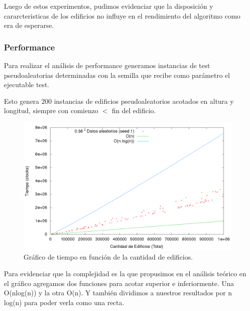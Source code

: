 Luego de estos experimentos, pudimos evidenciar que la disposición y cararcteristicas de los edificios no influye en el rendimiento del algoritmo como era de esperarse.


\subsubsection*{Performance}

Para realizar el análisis de performance generamos instancias de test pseudoaleatorias determinadas con la semilla que recibe como parámetro el ejecutable test.

Esto genera 200 instancias de edificios pseudoaleatorios acotados en altura y longitud, siempre con comienzo $<$ fin del edificio.

\begin{figure}[H]
\begin{center}
\includegraphics[scale=0.35]{./imagenes/ej2_chartRendimiento.png}
\caption{Gr\'afico de tiempo en funci\'on de la cantidad de edificios.}
\end{center}
\end{figure}

Para evidenciar que la complejidad es la que propusimos en el análisis teórico en el gráfico agregamos dos funciones para acotar superior e inferiormente. Una O(nlog(n)) y la otra O(n).
Y también dividimos a nuestros resultados por n log(n) para poder verla como una recta.